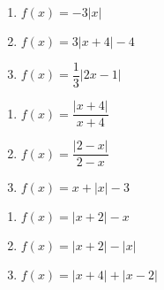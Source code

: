 \begin{multicols}{3}
\begin{enumerate}
\setcounter{enumi}{\value{HW}}

\item $f(x) = -3|x|$ 
\item $f(x) = 3|x + 4| - 4$ 
\item $f(x) = \dfrac{1}{3}|2x - 1|$

\setcounter{HW}{\value{enumi}}
\end{enumerate}
\end{multicols}

\begin{multicols}{3}
\begin{enumerate}
\setcounter{enumi}{\value{HW}}

\item $f(x) = \dfrac{|x + 4|}{x + 4}$
\item $f(x) = \dfrac{|2 - x|}{2 - x}$
\item  $f(x) = x + |x| - 3$ 

\setcounter{HW}{\value{enumi}}
\end{enumerate}
\end{multicols}

\begin{multicols}{3}
\begin{enumerate}
\setcounter{enumi}{\value{HW}}

\item  $f(x) = |x+2| - x$
\item  $f(x) = |x+2| - |x|$
\item $f(x) = |x + 4| + |x - 2|$ \label{graphabsvalexerlast}

\setcounter{HW}{\value{enumi}}
\end{enumerate}
\end{multicols}

